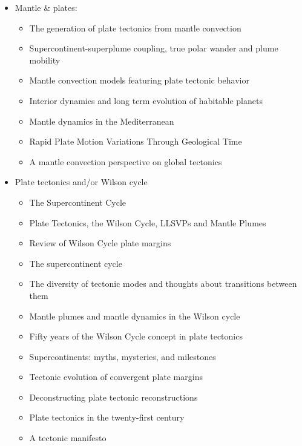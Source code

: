 \begin{itemize}
\item Mantle \& plates:
   \begin{itemize}
   \item [\twothousandthree] The generation of plate tectonics from mantle convection \cite{berc03}
   \item [\twothousandnine] Supercontinent-superplume coupling, true polar wander and plume mobility \cite{lizh09}
   \item [\twothousandeleven] Mantle convection models featuring plate tectonic behavior \cite{lowm11}
   \item [\twothousandtwelve] Interior dynamics and long term evolution of habitable planets \cite{taab12}
   \item [\twothousandfourteen] Mantle dynamics in the Mediterranean \cite{faba14}
   \item [\twothousandfifteen] Rapid Plate Motion Variations Through Geological Time \cite{iabu15}
   \item [\twothousandseventeen] A mantle convection perspective on global tectonics \cite{cogu17}
   \end{itemize}

\item Plate tectonics and/or Wilson cycle
   \begin{itemize}
   \item [\nineteeneightyeight] The Supercontinent Cycle \cite{nawm88}
   \item [\twothousandeleven] Plate Tectonics, the Wilson Cycle, LLSVPs and Mantle Plumes \cite{burk11}
   \item [\twothousandfourteen] Review of Wilson Cycle plate margins \cite{buto14}
   \item [\twothousandfourteen] The supercontinent cycle \cite{nams14}
   \item [\twothousandeighteen] The diversity of tectonic modes and thoughts about transitions between them \cite{lena18}
   \item [\twothousandnineteen] Mantle plumes and mantle dynamics in the Wilson cycle \cite{hero19}
   \item [\twothousandnineteen] Fifty years of the Wilson Cycle concept in plate tectonics \cite{wihb19}
   \item [\twothousandnineteen] Supercontinents: myths, mysteries, and milestones \cite{panm19}
   \item [\twothousandtwentytwo] Tectonic evolution of convergent plate margins \cite{zhcc22} 
   \item [\twothousandtwentythree] Deconstructing plate tectonic reconstructions \cite{sewd23}
   \item [\twothousandtwentythree] Plate tectonics in the twenty-first century \cite{zhen23}
   \item [\twothousandtwentythree] A tectonic manifesto \cite{stgt23}
   \end{itemize}


\end{itemize}
